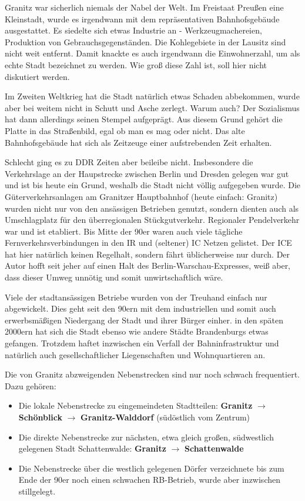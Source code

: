 Granitz war sicherlich niemals der Nabel der Welt.
Im Freistaat Preu{\ss}en eine Kleinstadt, wurde es irgendwann mit dem repr\"asentativen Bahnhofsgeb\"aude ausgestattet.
Es siedelte sich etwas Industrie an - Werkzeugmachereien, Produktion von Gebrauchsgegenst\"anden.
Die Kohlegebiete in der Lausitz sind nicht weit entfernt.
Damit knackte es auch irgendwann die Einwohnerzahl, um als echte Stadt bezeichnet zu werden.
Wie gro{\ss} diese Zahl ist, soll hier nicht diskutiert werden.

Im Zweiten Weltkrieg hat die Stadt nat\"urlich etwas Schaden abbekommen, wurde aber bei weitem nicht in Schutt und Asche zerlegt.
Warum auch?
Der Sozialismus hat dann allerdings seinen Stempel aufgepr\"agt.
Aus diesem Grund geh\"ort die Platte in das Stra{\ss}enbild, egal ob man es mag oder nicht.
Das alte Bahnhofsgeb\"aude hat sich als Zeitzeuge einer aufstrebenden Zeit erhalten.

Schlecht ging es zu DDR Zeiten aber beileibe nicht.
Insbesondere die Verkehrslage an der Haupstrecke zwischen Berlin und Dresden gelegen war gut und ist bis heute ein Grund, weshalb die Stadt nicht v\"ollig aufgegeben wurde.
Die G\"uterverkehrsanlagen am Granitzer Hauptbahnhof (heute einfach: Granitz) wurden nicht nur von den ans\"assigen Betrieben genutzt, sondern dienten auch als Umschlagplatz f\"ur den \"uberregionalen St\"uckgutverkehr.
Regionaler Pendelverkehr war und ist etabliert.
Bis Mitte der 90er waren auch viele t\"agliche Fernverkehrsverbindungen in den IR und (seltener) IC Netzen gelistet.
Der ICE hat hier nat\"urlich keinen Regelhalt, sondern f\"ahrt \"ublicherweise nur durch.
Der Autor hofft seit jeher auf einen Halt des Berlin-Warschau-Expresses, wei{\ss} aber, dass dieser Umweg unn\"otig und somit unwirtschaftlich w\"are.

Viele der stadtans\"assigen Betriebe wurden von der Treuhand einfach nur abgewickelt.
Dies geht seit den 90ern mit dem industriellen und somit auch erwerbsm\"a{\ss}igen Niedergang der Stadt und ihrer B\"urger einher.
in den sp\"aten 2000ern hat sich die Stadt ebenso wie andere St\"adte Brandenburgs etwas gefangen.
Trotzdem haftet inzwischen ein Verfall der Bahninfrastruktur und nat\"urlich auch gesellschaftlicher Liegenschaften und Wohnquartieren an.

Die von Granitz abzweigenden Nebenstrecken sind nur noch schwach frequentiert.
Dazu geh\"oren:
\begin{itemize}
	\item Die lokale Nebenstrecke zu eingemeindeten Stadtteilen: \textbf{Granitz} $\rightarrow$ \textbf{Sch\"onblick} $\rightarrow$ \textbf{Granitz-Walddorf} (s\"ud\"ostlich vom Zentrum)
	\item Die direkte Nebenstrecke zur n\"achsten, etwa gleich gro{\ss}en, s\"udwestlich gelegenen Stadt Schattenwalde: \textbf{Granitz} $\rightarrow$ \textbf{Schattenwalde}
	\item Die Nebenstrecke \"uber die westlich gelegenen D\"orfer verzeichnete bis zum Ende der 90er noch einen schwachen RB-Betrieb, wurde aber inzwischen stillgelegt.
\end{itemize}


